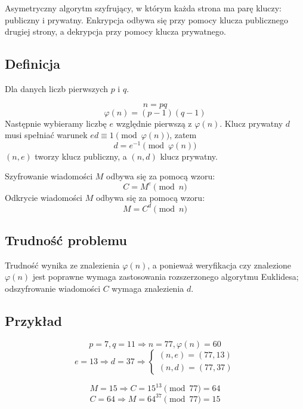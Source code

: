 \documentclass{../notatki}
\begin{document}
Asymetryczny algorytm szyfrujący, w którym każda strona ma parę
kluczy: publiczny i prywatny. Enkrypcja odbywa się przy pomocy klucza
publicznego drugiej strony, a dekrypcja przy pomocy klucza prywatnego.

\subsection{Definicja}

Dla danych liczb pierwszych $p$ i $q$.

$$
n = pq
$$
$$
\varphi(n) = (p-1)(q-1)
$$
Następnie wybieramy liczbę $e$ względnie pierwszą z $\varphi(n)$.
Klucz prywatny $d$ musi spełniać warunek $ed \equiv 1 \pmod{\varphi(n)}$, zatem
$$
d = e^{-1} \pmod{\varphi(n)}
$$
$(n, e)$ tworzy klucz publiczny, a $(n, d)$ klucz prywatny.

Szyfrowanie wiadomości $M$ odbywa się za pomocą wzoru:
$$
C = M^e \pmod{n}
$$
Odkrycie wiadomości $M$ odbywa się za pomocą wzoru:
$$
M = C^d \pmod{n}
$$

\subsection{Trudność problemu}

Trudność wynika ze znalezienia $\varphi(n)$, a ponieważ weryfikacja
czy znalezione $\varphi(n)$ jest poprawne wymaga zastosowania rozszerzonego
algorytmu Euklidesa; odszyfrowanie wiadomości $C$ wymaga znalezienia $d$.

\subsection{Przykład}

$$
p = 7, q = 11 \Rightarrow n = 77, \varphi(n) = 60
$$
$$
e = 13 \Rightarrow d = 37 \Rightarrow
\begin{cases}
  (n, e) = (77, 13) \\
  (n, d) = (77, 37)
\end{cases}
$$

$$
M = 15 \Rightarrow C = 15^{13} \pmod{77} = 64
$$
$$
C = 64 \Rightarrow M = 64^{37} \pmod{77} = 15
$$
\end{document}

